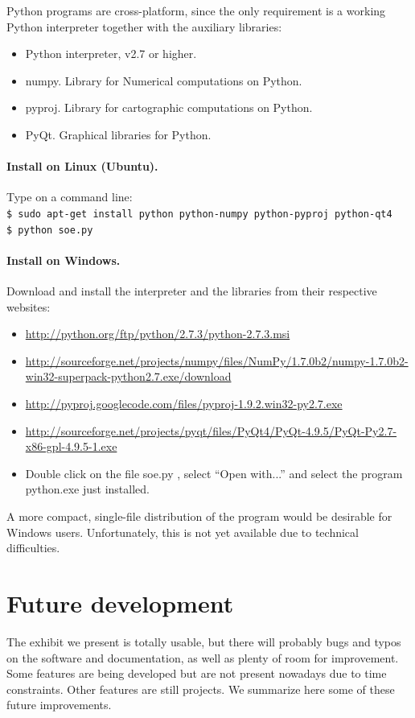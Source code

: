 \documentclass[a4paper,12pt]{article}
\begin{document}
Python programs are cross-platform, since the only requirement is a working Python interpreter together with the auxiliary libraries:
\begin{itemize}
 \item Python interpreter, v2.7 or higher.
 \item numpy. Library for Numerical computations on Python.
 \item pyproj. Library for cartographic computations on Python.
 \item PyQt. Graphical libraries for Python.
\end{itemize}

\paragraph{Install on Linux (Ubuntu).} Type on a command line:\\
\texttt{\$ sudo apt-get install python python-numpy python-pyproj python-qt4} \\
\texttt{\$ python soe.py}

\paragraph{Install on Windows.} Download and install the interpreter and the libraries from their respective websites:
\begin{itemize}
 \item \url{http://python.org/ftp/python/2.7.3/python-2.7.3.msi}
 \item \url{http://sourceforge.net/projects/numpy/files/NumPy/1.7.0b2/numpy-1.7.0b2-win32-superpack-python2.7.exe/download}
 \item \url{http://pyproj.googlecode.com/files/pyproj-1.9.2.win32-py2.7.exe}
 \item \url{http://sourceforge.net/projects/pyqt/files/PyQt4/PyQt-4.9.5/PyQt-Py2.7-x86-gpl-4.9.5-1.exe}
 \item Double click on the file soe.py , select ``Open with...'' and select the program python.exe just installed.
\end{itemize}
A more compact, single-file distribution of the program would be desirable for Windows users. Unfortunately, this is not yet available due to technical difficulties.


\section{Future development}
The exhibit we present is totally usable, but there will probably bugs and typos on the software and documentation, as well as plenty of room for improvement. Some features are being developed but are not present nowadays due to time constraints. Other features are still projects. We summarize here some of these future improvements.
\end{document}
